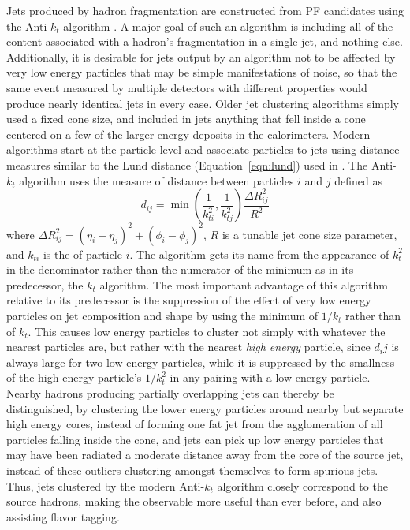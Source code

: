   Jets produced by hadron fragmentation are constructed from PF candidates using the Anti-$k_t$ algorithm \cite{antikt}.
  A major goal of such an algorithm is including all of the content associated with a hadron's fragmentation in a single jet, and nothing else.
  Additionally, it is desirable for jets output by an algorithm not to be affected by very low energy particles that may be simple manifestations of noise, so that the same event measured by multiple detectors with different properties would produce nearly identical jets in every case.
  Older jet clustering algorithms simply used a fixed cone size, and included in jets anything that fell inside a cone centered on a few of the larger energy deposits in the calorimeters.
  Modern algorithms start at the particle level and associate particles to jets using distance measures similar to the Lund distance (Equation~\ref{eqn:lund}) used in \mttwo.
  The Anti-$k_t$ algorithm uses the measure of distance between particles $i$ and $j$ defined as
  \begin{equation} \label{eqn:antikt}
    d_{ij} = \min\left(\frac{1}{k_{ti}^2},\frac{1}{k_{tj}^2}\right)\frac{\Delta R_{ij}^2}{R^2}
  \end{equation}
  where $\Delta R_{ij}^2=(\eta_i-\eta_j)^2 + (\phi_i-\phi_j)^2$, $R$ is a tunable jet cone size parameter, and $k_{ti}$ is the \pt of particle $i$.
  The algorithm gets its name from the appearance of $k_t^2$ in the denominator rather than the numerator of the minimum as in its predecessor, the $k_t$ algorithm.
  The most important advantage of this algorithm relative to its predecessor is the suppression of the effect of very low energy particles on jet composition and shape by using the minimum of $1/k_t$ rather than of $k_t$.
  This causes low energy particles to cluster not simply with whatever the nearest particles are, but rather with the nearest {\it high energy} particle, since $d_ij$ is always large for two low energy particles, while it is suppressed by the smallness of the high energy particle's $1/k_t^2$ in any pairing with a low energy particle.
  Nearby hadrons producing partially overlapping jets can thereby be distinguished, by clustering the lower energy particles around nearby but separate high energy cores, instead of forming one fat jet from the agglomeration of all particles falling inside the cone, and jets can pick up low energy particles that may have been radiated a moderate distance away from the core of the source jet, instead of these outliers clustering amongst themselves to form spurious jets.
  Thus, jets clustered by the modern Anti-$k_t$ algorithm closely correspond to the source hadrons, making the \njet observable more useful than ever before, and also assisting flavor tagging.


